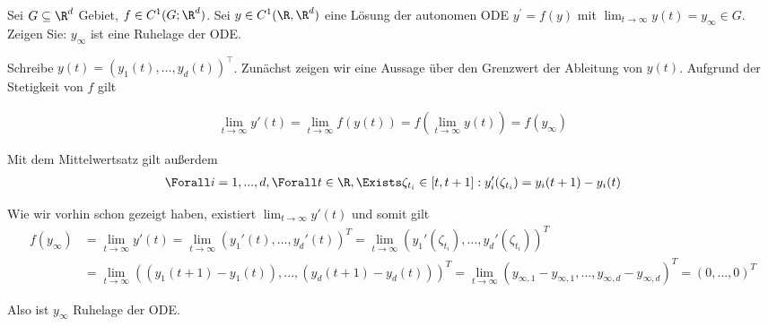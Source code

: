\begin{exercise}
Sei $G \subseteq \R^d$ Gebiet, $f \in C^1(G;\R^d)$. Sei $y \in C^1(\R,\R^d)$
eine Lösung der autonomen ODE $y^{\prime} = f(y)$ mit
$\lim_{t \rightarrow \infty} y(t) = y_{\infty} \in G$.
Zeigen Sie: $y_{\infty}$ ist eine Ruhelage der ODE.
\end{exercise}
\begin{solution}
Schreibe $y(t) = (y_1(t),\dots, y_d(t))^{\top}$.
Zunächst zeigen wir eine Aussage über den Grenzwert der Ableitung von $y(t)$. Aufgrund der Stetigkeit von $f$ gilt

\begin{align*}
  \lim_{t \to \infty} y'(t) = \lim_{t \to \infty} f(y(t)) = f(\lim_{t \to \infty} y(t)) = f(y_{\infty})
\end{align*}

Mit dem Mittelwertsatz gilt außerdem
\begin{align*}
  \Forall i = 1,...,d, \Forall t \in \R, \Exists \zeta_{t_i} \in [t,t+1]: y_i '(\zeta_{t_i}) = y_i(t+1)-y_i(t)
\end{align*}

Wie wir vorhin schon gezeigt haben, existiert $\lim_{t \to \infty} y'(t)$ und somit gilt
\begin{align*}
  f(y_\infty) &= \lim_{t \to \infty} y'(t) = \lim_{t \to \infty} (y_1'(t),...,y_d'(t))^{T}
  = \lim_{t \to \infty} (y_1'(\zeta_{t_i}),...,y_d'(\zeta_{t_i}))^{T}  \\
  &= \lim_{t \to \infty} ((y_1(t+1)-y_1(t)),...,(y_d(t+1)-y_d(t)))^{T}
  = \lim_{t \to \infty} (y_{\infty, 1} - y_{\infty, 1},...,y_{\infty, d} - y_{\infty, d})^{T}
  = (0,\dots,0)^T
\end{align*}

Also ist $y_{\infty}$ Ruhelage der ODE.
\end{solution}
